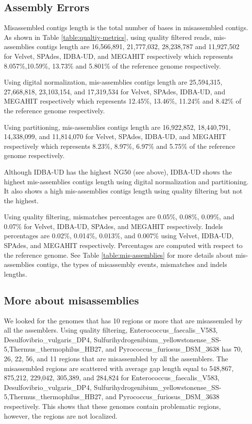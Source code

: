 \subsection*{Assembly Errors} 

Misassembled contigs length is the total number of bases in misassembled contigs.  As shown in Table \ref {table:qualtiy-metrics}, using quality filtered reads, mis-assemblies contigs length are 16,566,891, 21,777,032, 28,238,787 and 11,927,502 for Velvet, SPAdes, IDBA-UD, and MEGAHIT respectively which represents 8.057\%,10.59\%, 13.73\% and 5.801\% of the reference genome respectively.  


Using digital normalization,  mis-assemblies contigs length are 25,594,315, 27,668,818, 23,103,154, and 17,319,534 for Velvet, SPAdes, IDBA-UD, and MEGAHIT respectively which represents 12.45\%, 13.46\%, 11.24\% and 8.42\% of the reference genome respectively.  

Using partitioning,  mis-assemblies contigs length are 16,922,852, 18,440,791, 14,338,099, and 11,814,070 for Velvet, SPAdes, IDBA-UD, and MEGAHIT respectively which represents 8.23\%, 8.97\%, 6.97\% and 5.75\% of the reference genome respectively.  
 
Although IDBA-UD has the highest NG50 (see above), IDBA-UD shows the highest mis-assemblies contigs length using digital normalization and partitioning. It also shows a high mis-assemblies contigs length using quality filtering but not the highest.


Using quality filtering, mismatches percentages are 0.05\%, 0.08\%, 0.09\%, and 0.07\% for Velvet, IDBA-UD, SPAdes, and MEGAHIT respectively. Indels percentages are 0.02\%, 0.014\%, 0.013\%, and 0.007\% using Velvet, IDBA-UD, SPAdes, and MEGAHIT respectively. Percentages are computed with respect to the reference genome. See Table \ref{table:mis-assemblies}  for more details about mis-assemblies contigs, the types of misassembly events, mismatches and indels lengths.


\subsection*{More about misassemblies} 
We looked for the genomes that has 10 regions or more that are misassemled by all the assemblers. Using quality filtering,  Enterococcus\_faecalis\_V583, Desulfovibrio\_vulgaris\_DP4, Sulfurihydrogenibium\_yellowstonense\_SS-5,Thermus\_thermophilus\_HB27, and Pyrococcus\_furiosus\_DSM\_3638  has 70, 26, 22, 56, and 11 regions that are misassembled by all the assemblers. The misassembled regions are scattered with  average gap length equal to 548,867, 875,212, 229,042, 305,389, and  284,824 for  Enterococcus\_faecalis\_V583, Desulfovibrio\_vulgaris\_DP4, Sulfurihydrogenibium\_yellowstonense\_SS-5,Thermus\_thermophilus\_HB27, and Pyrococcus\_furiosus\_DSM\_3638 respectively. This shows that these genomes contain problematic regions, however, the regions are not localized. 

